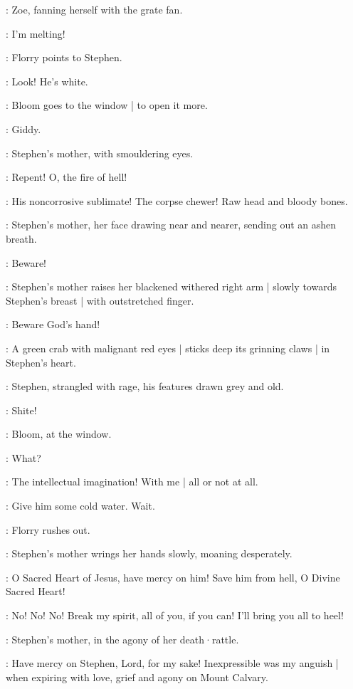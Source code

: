 :
Zoe,
fanning herself with the grate fan.

\Zoe:
I'm melting!

:
Florry points to Stephen.

\Florry:
Look!
He's white.

:
Bloom goes to the window |
to open it more.

\Bloom:
Giddy.

:
Stephen's mother,
with smouldering eyes.

\Mother:
Repent!
O,
the fire of hell!

\Stephen:
His noncorrosive sublimate!
The corpse chewer!
Raw head and bloody bones.

:
Stephen's mother,
her face drawing near and nearer,
sending out an ashen breath.

\Mother:
Beware!

:
Stephen's mother raises her blackened withered right arm |
slowly towards Stephen's breast |
with outstretched finger.

\Mother:
Beware God's hand!

:
A green crab with malignant red eyes |
%
sticks deep its grinning claws |
in Stephen's heart.

:
Stephen,
strangled with rage,
his features drawn grey and old.

\Stephen:
Shite!

:
Bloom,
at the window.

\Bloom:
What?

\Stephen:
The intellectual imagination!
With me |
all or not at all.

\Florry:
Give him some cold water.
Wait.

:
Florry rushes out.

:
Stephen's mother wrings her hands slowly,
moaning desperately.

\Mother:
O Sacred Heart of Jesus,
have mercy on him!
Save him from hell,
O Divine Sacred Heart!

\Stephen:
No!
No!
No!
Break my spirit,
all of you,
if you can!
I'll bring you all to heel!

:
Stephen's mother,
in the agony of her death·rattle.

\Mother:
Have mercy on Stephen,
Lord,
for my sake!
Inexpressible was my anguish |
when expiring with love,
grief and agony
%
on Mount Calvary.

